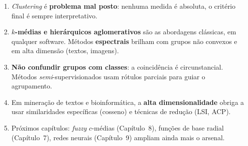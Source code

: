 \begin{enumerate}[leftmargin=1.2cm]
  \item \emph{Clustering} é \textbf{problema mal posto}: nenhuma medida
        é absoluta, o critério final é sempre interpretativo.
  \item \textbf{$k$-médias e hierárquicos aglomerativos} são as
        abordagens clássicas, em qualquer software. Métodos
        \textbf{espectrais} brilham com grupos não convexos e em alta
        dimensão (textos, imagens).
  \item \textbf{Não confundir grupos com classes}: a coincidência é
        circunstancial. Métodos \emph{semi}-supervisionados usam
        rótulos parciais para guiar o agrupamento.
  \item Em mineração de textos e bioinformática, a \textbf{alta
        dimensionalidade} obriga a usar similaridades específicas
        (cosseno) e técnicas de redução (LSI, ACP).
  \item Próximos capítulos: \emph{fuzzy} $c$-médias (Capítulo~8),
        funções de base radial (Capítulo~7), redes neurais
        (Capítulo~9) ampliam ainda mais o arsenal.
\end{enumerate}


